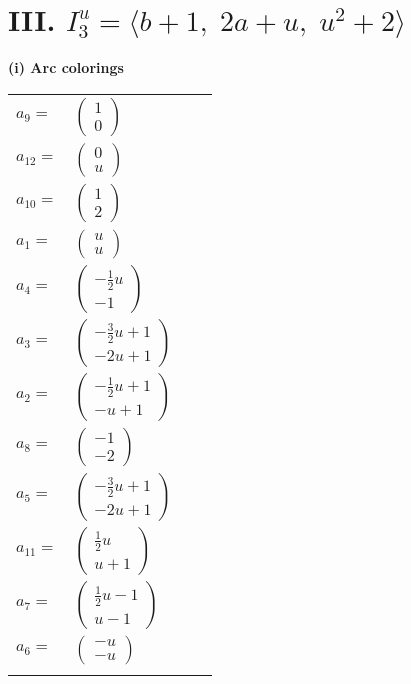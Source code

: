 \documentclass[1p]{elsarticle_modified}
\theoremstyle{definition}
\begin{document}
\centering \section*{III. $I^u_{3}= \langle b+1,\;2 a+u,\;u^2+2 \rangle$}
\flushleft \textbf{(i) Arc colorings}\\
\begin{tabular}{m{7pt} m{180pt} m{7pt} m{180pt} }
\flushright $a_{9}=$&$\begin{pmatrix}1\\0\end{pmatrix}$ \\
\flushright $a_{12}=$&$\begin{pmatrix}0\\u\end{pmatrix}$ \\
\flushright $a_{10}=$&$\begin{pmatrix}1\\2\end{pmatrix}$ \\
\flushright $a_{1}=$&$\begin{pmatrix}u\\u\end{pmatrix}$ \\
\flushright $a_{4}=$&$\begin{pmatrix}-\frac{1}{2} u\\-1\end{pmatrix}$ \\
\flushright $a_{3}=$&$\begin{pmatrix}-\frac{3}{2} u+1\\-2 u+1\end{pmatrix}$ \\
\flushright $a_{2}=$&$\begin{pmatrix}-\frac{1}{2} u+1\\- u+1\end{pmatrix}$ \\
\flushright $a_{8}=$&$\begin{pmatrix}-1\\-2\end{pmatrix}$ \\
\flushright $a_{5}=$&$\begin{pmatrix}-\frac{3}{2} u+1\\-2 u+1\end{pmatrix}$ \\
\flushright $a_{11}=$&$\begin{pmatrix}\frac{1}{2} u\\u+1\end{pmatrix}$ \\
\flushright $a_{7}=$&$\begin{pmatrix}\frac{1}{2} u-1\\u-1\end{pmatrix}$ \\
\flushright $a_{6}=$&$\begin{pmatrix}- u\\- u\end{pmatrix}$\\&\end{tabular}
\end{document}
